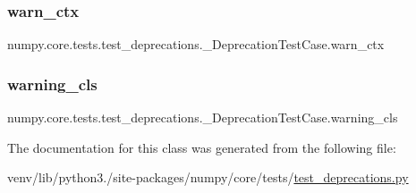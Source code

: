 \subsubsection{\texorpdfstring{warn\+\_\+ctx}{warn\_ctx}}
{\footnotesize\ttfamily numpy.\+core.\+tests.\+test\+\_\+deprecations.\+\_\+\+Deprecation\+Test\+Case.\+warn\+\_\+ctx}

\mbox{\label{classnumpy_1_1core_1_1tests_1_1test__deprecations_1_1__DeprecationTestCase_aaf0ae6e0a7f5c5bb6609954fa7bb59bb}} 
\subsubsection{\texorpdfstring{warning\+\_\+cls}{warning\_cls}}
{\footnotesize\ttfamily numpy.\+core.\+tests.\+test\+\_\+deprecations.\+\_\+\+Deprecation\+Test\+Case.\+warning\+\_\+cls\hspace{0.3cm}{\ttfamily [static]}}



The documentation for this class was generated from the following file\+:\begin{DoxyCompactItemize}
\item 
venv/lib/python3./site-\/packages/numpy/core/tests/\hyperlink{core_2tests_2test__deprecations_8py}{test\+\_\+deprecations.\+py}\end{DoxyCompactItemize}
